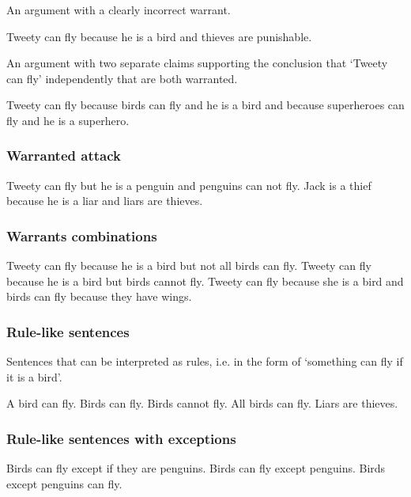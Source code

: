 \noindent An argument with a clearly incorrect warrant.
\begin{exe}
\ex\label{e44} Tweety can fly because he is a bird and thieves are punishable.
\end{exe}

\noindent An argument with two separate claims supporting the conclusion that `Tweety can fly' independently that are both warranted.
\begin{exe}
\ex\label{e45} Tweety can fly because birds can fly and he is a bird and because superheroes can fly and he is a superhero.
\end{exe}

\subsubsection{Warranted attack}
\begin{exe}
\ex\label{e46} Tweety can fly but he is a penguin and penguins can not fly.
\ex\label{e47} Jack is a thief because he is a liar and liars are thieves.
\end{exe}

\subsubsection{Warrants combinations}
\begin{exe}
\ex\label{e48} Tweety can fly because he is a bird but not all birds can fly.
\ex\label{e49} Tweety can fly because he is a bird but birds cannot fly.
\ex\label{e50} Tweety can fly because she is a bird and birds can fly because they have wings.
\end{exe}

\subsubsection{Rule-like sentences}
Sentences that can be interpreted as rules, i.e. in the form of `something can fly if it is a bird'.
\begin{exe}
\ex\label{e51} A bird can fly.
\ex\label{e52} Birds can fly.
\ex\label{e53} Birds cannot fly.
\ex\label{e54} All birds can fly.
\ex\label{e55} Liars are thieves.
\end{exe}

\subsubsection{Rule-like sentences with exceptions}
\begin{exe}
\ex\label{e56} Birds can fly except if they are penguins.
\ex\label{e57} Birds can fly except penguins.
\ex\label{e58} Birds except penguins can fly.
\end{exe}

